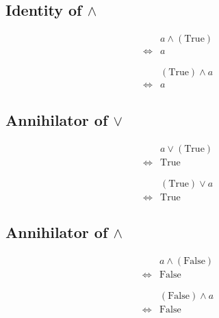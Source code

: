 \subsection{Identity of $\land$}
\begin{prop}
\label{Proposition:land_identity_1}
\begin{align*}
& a \land (\text{True}) \\
\iff & a
\end{align*}
\end{prop}

\begin{prop}
\label{Proposition:land_identity_2}
\begin{align*}
& (\text{True}) \land a \\
\iff & a
\end{align*}
\end{prop}

\subsection{Annihilator of $\lor$}
\begin{prop}
\label{Proposition:lor_annihilator_1}
\begin{align*}
& a \lor (\text{True}) \\
\iff & \text{True}
\end{align*}
\end{prop}

\begin{prop}
\label{Proposition:lor_annihilator_2}
\begin{align*}
& (\text{True}) \lor a \\
\iff & \text{True}
\end{align*}
\end{prop}

\subsection{Annihilator of $\land$}
\begin{prop}
\label{Proposition:land_annihilator_1}
\begin{align*}
& a \land (\text{False}) \\
\iff & \text{False}
\end{align*}
\end{prop}

\begin{prop}
\label{Proposition:land_annihilator_2}
\begin{align*}
& (\text{False}) \land a \\
\iff & \text{False}
\end{align*}
\end{prop}

